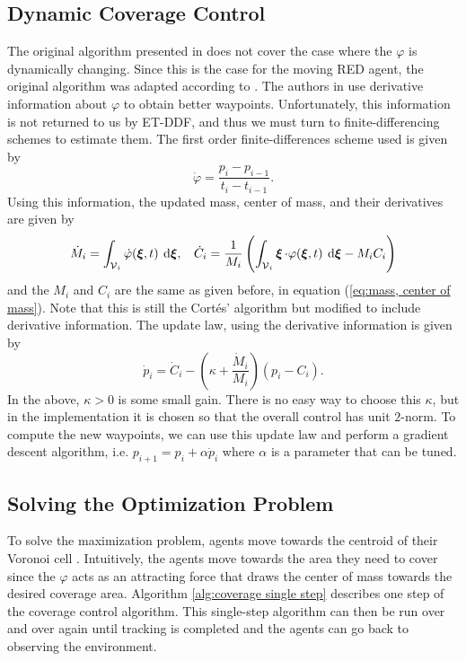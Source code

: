 \documentclass{article}
\DeclareMathOperator{\bxi}{\boldsymbol{\xi}}
\begin{document}
\subsection{Dynamic Coverage Control}
The original algorithm presented in \cite{Cortes:2004} does not cover the case where the $\varphi$ is dynamically changing. Since this is the case for the moving RED agent, the original algorithm was adapted according to \cite{Diaz-Mercado2017}. The authors in \cite{Diaz-Mercado2017} use derivative information about $\varphi$ to obtain better waypoints. Unfortunately, this information is not returned to us by ET-DDF, and thus we must turn to finite-differencing schemes to estimate them. The first order finite-differences scheme used is given by 
\begin{equation}
	\dot{\varphi} = \frac{p_{i} - p_{i-1}}{t_{i} - t_{i-1}}.
\end{equation}
Using this information, the updated mass, center of mass, and their derivatives are given by 
\begin{equation}
	\label{eq:centers with derivative information}
	\displaystyle \dot{M}_i = \int_{\V_i}{\dot{\varphi}(\bxi, t) \: \dif \bxi}, \:\:\:\: \dot{C}_i = \frac{1}{M_i}\left( \int_{\V_i}{\bxi \cdot \varphi(\bxi, t) \: \dif \bxi} - M_iC_i\right)
\end{equation}
and the $M_i$ and $C_i$ are the same as given before, in equation (\ref{eq:mass, center of mass}). Note that this is still the Cort\'es' algorithm but modified to include derivative information.  The update law, using the derivative information is given by 
\begin{equation}
	\label{eq:cortes update law}
	\displaystyle \dot{p}_i = \dot{C}_i - \left( \kappa + \frac{\dot{M}_i}{M_i} \right) (p_i - C_i).
\end{equation}
In the above, $\kappa > 0$ is some small gain. There is no easy way to choose this $\kappa$, but in the implementation it is chosen so that the overall control has unit $2$-norm. To compute the new waypoints, we can use this update law and perform a gradient descent algorithm, i.e. $p_{i+1} = p_i + \alpha \dot{p}_{i}$ where $\alpha$ is a parameter that can be tuned.

\subsection{Solving the Optimization Problem}
To solve the maximization problem, agents move towards the centroid of their Voronoi cell \cite{Cortes:2004}. Intuitively, the agents move towards the area they need to cover since the $\varphi$ acts as an attracting force that draws the center of mass towards the desired coverage area. Algorithm \ref{alg:coverage single step} describes one step of the coverage control algorithm. This single-step algorithm can then be run over and over again until tracking is completed and the agents can go back to observing the environment.
\end{document}
